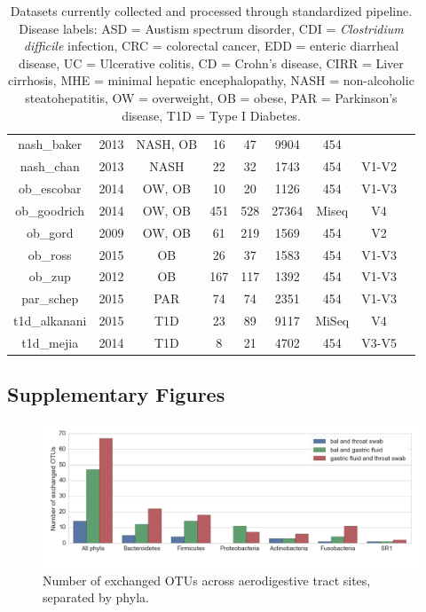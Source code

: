 \documentclass[12pt]{article}
\begin{document}
{\begin{table}[h]
{\begin{tabular}{|c|c|c|c|c|c|c|c|c|}
	nash\_baker & 2013 & NASH, OB & 16 & 47 & 9904 & 454 &   & \cite{nash-baker}\\ 
	nash\_chan & 2013 & NASH & 22 & 32 & 1743 & 454 & V1-V2 & \cite{nash-chan}\\ 
	ob\_escobar & 2014 & OW, OB & 10 & 20 & 1126 & 454 & V1-V3 & \cite{ob-escobar}\\ 
	ob\_goodrich & 2014 & OW, OB & 451 & 528 & 27364 & Miseq & V4 & \cite{ob-goodrich}\\ 
	ob\_gord & 2009 & OW, OB & 61 & 219 & 1569 & 454 & V2 & \cite{ob-gordon}\\ 
	ob\_ross & 2015 & OB & 26 & 37 & 1583 & 454 & V1-V3 & \cite{ob-ross}\\ 
	ob\_zup & 2012 & OB & 167 & 117 & 1392 & 454 & V1-V3 & \cite{ob-zupancic}\\ 
	par\_schep & 2015 & PAR & 74 & 74 & 2351 & 454 & V1-V3 & \cite{par-schep}\\ 
	t1d\_alkanani & 2015 & T1D & 23 & 89 & 9117 & MiSeq & V4 & \cite{t1d_alkanani}\\ 
	t1d\_mejia & 2014 & T1D & 8 & 21 & 4702 & 454 & V3-V5 & \cite{t1d_mejia}\\ 	
	\hline
\end{tabular}}
\caption{Datasets currently collected and processed through standardized pipeline. Disease labels: ASD = Austism spectrum disorder, CDI = \textit{Clostridium difficile} infection, CRC = colorectal cancer, EDD = enteric diarrheal disease, UC = Ulcerative colitis, CD = Crohn's disease, CIRR = Liver cirrhosis, MHE =  minimal hepatic encephalopathy, NASH = non-alcoholic steatohepatitis, OW = overweight, OB = obese, PAR = Parkinson's disease, T1D = Type I Diabetes. }\label{tab:datasets}
\end{table}
}

\newpage
\subsection{Supplementary Figures}\label{sec:appendix_figures}

\begin{figure}[h]
\begin{center}
	\includegraphics[scale=0.6]{shared_phyla}
	\caption{Number of exchanged OTUs across aerodigestive tract
	sites, separated by phyla.}
	\label{fig:shared_phyla}
\end{center}
\end{figure}
\end{document}
